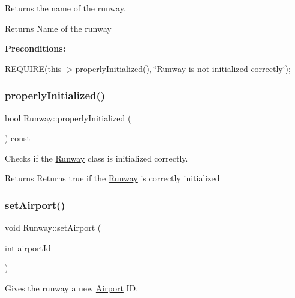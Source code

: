 Returns the name of the runway. 

\begin{DoxyReturn}{Returns}
Name of the runway
\end{DoxyReturn}
{\bfseries Preconditions\+:}
\begin{DoxyItemize}
\item R\+E\+Q\+U\+I\+RE(this-\/$>$\mbox{\hyperlink{class_runway_a360d98246cabf3aa929765f81a656348}{properly\+Initialized()}}, \char`\"{}\+Runway is not initialized correctly\char`\"{}); 
\end{DoxyItemize}\mbox{\label{class_runway_a360d98246cabf3aa929765f81a656348}} 
\subsubsection{\texorpdfstring{properly\+Initialized()}{properlyInitialized()}}
{\footnotesize\ttfamily bool Runway\+::properly\+Initialized (\begin{DoxyParamCaption}{ }\end{DoxyParamCaption}) const}



Checks if the \mbox{\hyperlink{class_runway}{Runway}} class is initialized correctly. 

\begin{DoxyReturn}{Returns}
Returns true if the \mbox{\hyperlink{class_runway}{Runway}} is correctly initialized 
\end{DoxyReturn}
\mbox{\label{class_runway_a6614626321a1f4c33f24800cbe78d330}} 
\subsubsection{\texorpdfstring{set\+Airport()}{setAirport()}}
{\footnotesize\ttfamily void Runway\+::set\+Airport (\begin{DoxyParamCaption}\item[{int}]{airport\+Id }\end{DoxyParamCaption})}



Gives the runway a new \mbox{\hyperlink{class_airport}{Airport}} ID. 


